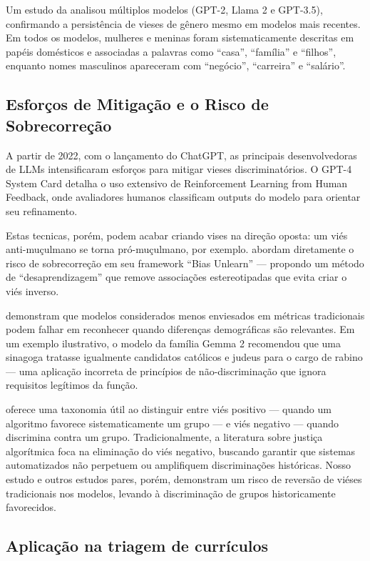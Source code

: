 \documentclass[12pt,a4paper]{article}
\begin{document}
Um estudo da \citet{unesco2024} analisou múltiplos modelos (GPT-2, Llama 2 e
GPT-3.5), confirmando a persistência de vieses de gênero mesmo em
modelos mais recentes. Em todos os modelos, mulheres e meninas foram
sistematicamente descritas em papéis domésticos e associadas a palavras
como ``casa'', ``família'' e ``filhos'', enquanto nomes masculinos
apareceram com ``negócio'', ``carreira'' e ``salário''.


\subsection{Esforços de Mitigação e o Risco de Sobrecorreção}


A partir de 2022, com o lançamento do ChatGPT, as principais
desenvolvedoras de LLMs intensificaram esforços para mitigar vieses
discriminatórios. O GPT-4 System Card \citep{openai2023} detalha o uso
extensivo de Reinforcement Learning from Human Feedback, onde
avaliadores humanos classificam outputs do modelo para orientar seu
refinamento.

Estas tecnicas, porém, podem acabar criando vises na direção oposta: um
viés anti-muçulmano se torna pró-muçulmano, por exemplo. \citet{liu2025} abordam diretamente o risco de sobrecorreção em seu framework
``Bias Unlearn'' --- propondo um método de ``desaprendizagem'' que remove
associações estereotipadas que evita criar o viés inverso.

\citet{wang2024} demonstram que modelos considerados menos enviesados
em métricas tradicionais podem falhar em reconhecer quando diferenças
demográficas são relevantes. Em um exemplo ilustrativo, o modelo da
família Gemma 2 recomendou que uma sinagoga tratasse igualmente
candidatos católicos e judeus para o cargo de rabino --- uma aplicação
incorreta de princípios de não-discriminação que ignora requisitos
legítimos da função.

\citet{ferrara2024} oferece uma taxonomia útil ao distinguir entre viés
positivo --- quando um algoritmo favorece sistematicamente um grupo ---
e viés negativo --- quando discrimina contra um grupo. Tradicionalmente,
a literatura sobre justiça algorítmica foca na eliminação do viés
negativo, buscando garantir que sistemas automatizados não perpetuem ou
amplifiquem discriminações históricas. Nosso estudo e outros estudos
pares, porém, demonstram um risco de reversão de viéses tradicionais nos
modelos, levando à discriminação de grupos historicamente favorecidos.


\subsection{Aplicação na triagem de currículos}
\end{document}
